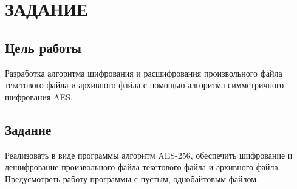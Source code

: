 \chapter*{ЗАДАНИЕ}

\section*{Цель работы}

Разработка алгоритма шифрования и расшифрования произвольного файла текстового файла и архивного файла с помощью алгоритма симметричного шифрования AES.

\section*{Задание}

Реализовать в виде программы алгоритм AES-256, обеспечить шифрование и дешифрование произвольного файла текстового файла и архивного файла. Предусмотреть работу программы с пустым, однобайтовым файлом.

